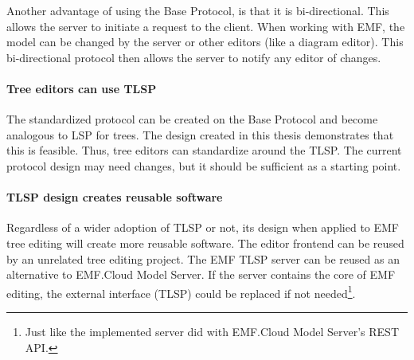 Another advantage of using the Base Protocol, is that it is bi-directional.
This allows the server to initiate a request to the client.
When working with \acrshort{EMF}, the model can be changed by the server or other editors (like a diagram editor).
This bi-directional protocol then allows the server to notify any editor of changes.

\paragraph{Tree editors can use TLSP}
The standardized protocol can be created on the Base Protocol and become analogous to \acrshort{LSP} for trees.
The design created in this thesis demonstrates that this is feasible.
Thus, tree editors can standardize around the \acrfull{TLSP}.
The current protocol design may need changes, but it should be sufficient as a starting point.

\paragraph{TLSP design creates reusable software}
Regardless of a wider adoption of \acrshort{TLSP} or not, its design when applied to \acrshort{EMF} tree editing will create more reusable software.
The editor frontend can be reused by an unrelated tree editing project.
The \acrshort{EMF} \acrshort{TLSP} server can be reused as an alternative to EMF.Cloud Model Server.
If the server contains the core of \acrshort{EMF} editing, the external interface (\acrshort{TLSP}) could be replaced if not needed\footnote{Just like the implemented server did with EMF.Cloud Model Server's \gls{REST} \acrshort{API}.}.

